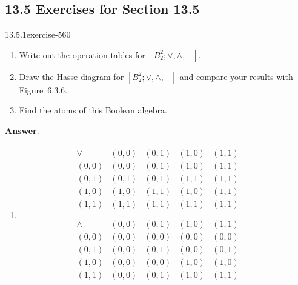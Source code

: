 \documentclass[twoside,10pt,]{book}
\numberwithin{equation}{section}
\begin{document}
\subsection*{13.5 Exercises for Section 13.5}
\begin{divisionsolution}{13.5.1}{}{exercise-560}%
\hypertarget{p-4967}{}%
\leavevmode%
\begin{enumerate}[label=(\alph*)]
\item\hypertarget{li-2254}{}\hypertarget{p-4968}{}%
Write out the operation tables for \(\left[B_2^2; \lor , \land, - \right].\)%
\item\hypertarget{li-2255}{}\hypertarget{p-4969}{}%
Draw the Hasse diagram for \(\left[B_2^2; \lor , \land, - \right]\) and compare your results with  Figure~6.3.6.%
\item\hypertarget{li-2256}{}\hypertarget{p-4970}{}%
Find the atoms of this Boolean algebra.%
\end{enumerate}
%
\par\smallskip%
\noindent\textbf{Answer}.\quad%
\hypertarget{p-4971}{}%
\leavevmode%
\begin{enumerate}[label=(\alph*)]
\item\hypertarget{li-2257}{}\hypertarget{p-4972}{}%
%
\begin{equation*}
\begin{array}{lc} 
\begin{array}{c|cccc}
\lor & (0,0) & (0,1) & (1,0) & (1,1) \\
\hline
(0,0) & (0,0) & (0,1) & (1,0) & (1,1) \\
(0,1) &(0,1) & (0,1) & (1,1) & (1,1) \\
(1,0) & (1,0) & (1,1) & (1,0) & (1,1) \\
(1,1) & (1,1) & (1,1) & (1,1) & (1,1) \\
\end{array}
&\\
\begin{array}{c|cccc}
\land & (0,0) & (0,1) & (1,0) & (1,1) \\
\hline
(0,0) &(0,0) & (0,0) & (0,0) & (0,0) \\
(0,1) &(0,0) & (0,1) & (0,0) & (0,1) \\
(1,0) &(0,0) & (0,0) & (1,0) & (1,0) \\
(1,1) &(0,0) & (0,1) & (1,0) & (1,1) \\
\end{array}
&
\begin{array}{c|c}

\end{array}
\end{array}
\end{equation*}
\end{enumerate}
\end{divisionsolution}
\end{document}
